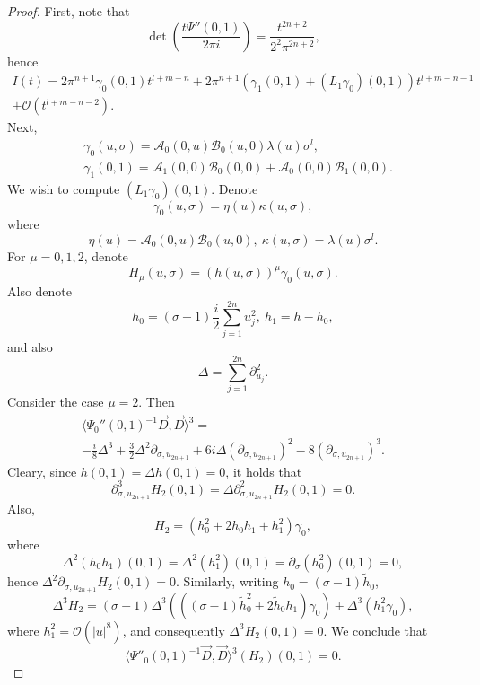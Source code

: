 \documentclass{article}
\newcommand{\mca}{\mathcal A}
\newcommand{\mcb}{\mathcal B}
\newcommand{\mco}{\mathcal O}
\begin{document}
\begin{proof}
%
First, note that
\begin{equation*} \det \left(\frac {t \Psi''(0,1)}{2\pi i} \right) = \frac{t^{2n+2}}{2^2 \pi^{2n+2}},\end{equation*}
hence
\begin{multline*} I(t) = 2 \pi^{n+1}\gamma_0(0,1)t^{l+m-n} + 2\pi^{n+1} \left(\gamma_1(0,1) + (L_1 \gamma_0)(0,1)\right)t^{l+m-n-1}\\ + \mco(t^{l+m-n-2}).\end{multline*}
%
Next,$$\begin{aligned} & \gamma_0(u, \sigma) = \mca_0(0, u) \mcb_0(u, 0) \lambda(u)\sigma^l,\\ & \gamma_1(0,1) = \mca_1(0,0) \mcb_0(0,0) + \mca_0(0,0) \mcb_1(0,0).\end{aligned}$$
We wish to compute $(L_1 \gamma_0)(0,1)$. Denote $$\gamma_0(u,\sigma) = \eta(u) \kappa(u, \sigma),$$
where $$\eta(u) = \mca_0(0, u) \mcb_0(u, 0),\ \kappa(u, \sigma) = \lambda(u) \sigma^l.$$
%
For $\mu = 0,1,2$, denote $$H_{\mu}(u,\sigma) = \left(h(u,\sigma)\right)^\mu \gamma_0(u, \sigma).$$
Also denote
\begin{equation*} h_0 =  (\sigma-1) \frac i 2 \sum_{j=1}^{2n} u_{j}^2,\ h_1 = h-h_0,\end{equation*}
%
and also
\begin{equation*}  \Delta = \sum_{j=1}^{2n} \partial_{u_{j}}^2.\end{equation*}
Consider the case $\mu = 2$. Then
\begin{multline*} \langle \Psi_0''(0,1)^{-1}\vec D, \vec D \rangle^3 =\\ -\frac i {8} \Delta^3 +\frac 3 2 \Delta^2 \partial_{\sigma,u_{2n+1}} +  6 i \Delta (\partial_{\sigma, u_{2n+1}})^2 -8 (\partial_{\sigma, u_{2n+1}})^3.\end{multline*}
Cleary, since $h(0,1) = \Delta h(0,1) = 0$, it holds that
\begin{equation*} \partial^3_{\sigma, u_{2n+1}} H_{2}(0,1) = \Delta \partial^2_{\sigma, u_{2n+1}}H_{2}(0,1) = 0.\end{equation*}
Also,
\begin{equation*} H_{2} = (h_0^2 + 2 h_0 h_1 + h_1^2) \gamma_0,\end{equation*}
where $$\Delta^2( h_0 h_1)(0,1)= \Delta^2(h_1^2)(0,1) = \partial_\sigma(h_0^2)(0,1)= 0,$$ hence
$\Delta^2 \partial_{\sigma, u_{2n+1}} H_{2}(0,1) = 0$. Similarly, writing $h_0 = (\sigma-1) \tilde h_0$,
$$\Delta^3 H_{2}= (\sigma-1) \Delta^3\left(((\sigma-1)\tilde h_0^2 + 2 \tilde h_0 h_1) \gamma_0\right) + \Delta^3\left(h_1^2  \gamma_0\right),$$
where $h_1^2 = \mco(|u|^8)$, and consequently $\Delta^3 H_{2}(0,1) = 0$. We conclude that
\begin{equation*} \langle \Psi''_0(0,1)^{-1} \vec D, \vec D \rangle^3 (H_{2})(0,1) = 0.\end{equation*}


\end{proof}
\end{document}
